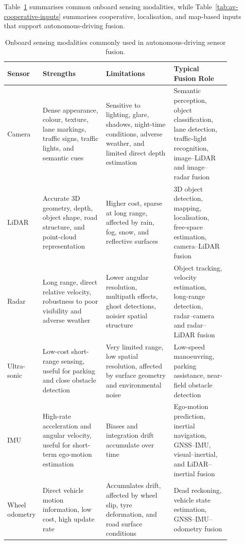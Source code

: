 Table~\ref{tab:av-onboard-sensors} summarises common onboard sensing modalities, while Table~\ref{tab:av-cooperative-inputs} summarises cooperative, localisation, and map-based inputs that support autonomous-driving fusion.

\begin{table}[!t]
    \centering
    \renewcommand{\arraystretch}{1.25}%
    \small
    \caption{Onboard sensing modalities commonly used in autonomous-driving sensor fusion.}
    \label{tab:av-onboard-sensors}
    \begin{tabular}{p{0.08\linewidth} p{0.28\linewidth} p{0.30\linewidth} p{0.25\linewidth}}
        \hline
        \textbf{Sensor} & \textbf{Strengths} & \textbf{Limitations} & \textbf{Typical Fusion Role} \\
        \hline
        Camera & Dense appearance, colour, texture, lane markings, traffic signs, traffic lights, and semantic cues & Sensitive to lighting, glare, shadows, night-time conditions, adverse weather, and limited direct depth estimation & Semantic perception, object classification, lane detection, traffic-light recognition, image--LiDAR and image--radar fusion \\
        \hline
        LiDAR & Accurate 3D geometry, depth, object shape, road structure, and point-cloud representation & Higher cost, sparse at long range, affected by rain, fog, snow, and reflective surfaces & 3D object detection, mapping, localisation, free-space estimation, camera--LiDAR fusion \\
        \hline
        Radar & Long range, direct relative velocity, robustness to poor visibility and adverse weather & Lower angular resolution, multipath effects, ghost detections, noisier spatial structure & Object tracking, velocity estimation, long-range detection, radar--camera and radar--LiDAR fusion \\
        \hline
        Ultra-\allowbreak sonic & Low-cost short-range sensing, useful for parking and close obstacle detection & Very limited range, low spatial resolution, affected by surface geometry and environmental noise & Low-speed manoeuvring, parking assistance, near-field obstacle detection \\
        \hline
        IMU & High-rate acceleration and angular velocity, useful for short-term ego-motion estimation & Biases and integration drift accumulate over time & Ego-motion prediction, inertial navigation, GNSS--IMU, visual--inertial, and LiDAR--inertial fusion \\
        \hline
        Wheel odometry & Direct vehicle motion information, low cost, high update rate & Accumulates drift, affected by wheel slip, tyre deformation, and road surface conditions & Dead reckoning, vehicle state estimation, GNSS--IMU--odometry fusion \\
        \hline
    \end{tabular}
\end{table}

